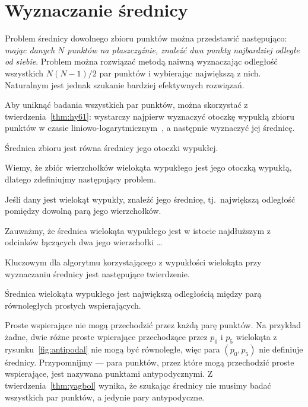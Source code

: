 \chapter{Wyznaczanie średnicy\label{chap:diameter}}
Problem średnicy dowolnego zbioru punktów można przedstawić
następująco: \emph{mając danych $N$ punktów na płaszczyźnie, znaleźć
  dwa punkty najbardziej odległe od siebie}. Problem można rozwiązać
metodą naiwną wyznaczając odległość wszystkich $N(N-1)/2$ par punktów
i wybierając największą z nich. Naturalnym jest jednak szukanie
bardziej efektywnych rozwiązań.

Aby uniknąć badania wszystkich par punktów, można skorzystać z
twierdzenia~\ref{thm:hy61}: wystarczy najpierw wyznaczyć otoczkę
wypukłą zbioru punktów w czasie
liniowo-logarytmicznym~\cite{Graham72}, a następnie wyznaczyć jej
średnicę.

\begin{twierdzenie}
  Średnica zbioru jest równa średnicy jego otoczki wypukłej.
\end{twierdzenie}

Wiemy, że zbiór wierzchołków wielokąta wypukłego jest jego otoczką
wypukłą, dlatego zdefiniujmy następujący problem.

\begin{problem}
  Jeśli dany jest wielokąt wypukły, znaleźć jego średnicę,
  tj.\ największą odległość pomiędzy dowolną parą jego wierzchołków.
\end{problem}

Zauważmy, że średnica wielokąta wypukłego jest w istocie najdłuższym z
odcinków łączących dwa jego wierzchołki \ldots

Kluczowym dla algorytmu korzystającego z wypukłości wielokąta przy
wyznaczaniu średnicy jest następujące twierdzenie.

\begin{twierdzenie}
\label{thm:yagbol}
  Średnica wielokąta wypukłego jest największą odległością między parą
  równoległych prostych wspierających.
\end{twierdzenie}

Proste wspierające nie mogą przechodzić przez każdą parę punktów. Na
przykład żadne, dwie różne proste wpierające przechodzące przez $p_0$
i $p_5$ wielokąta z rysunku~\ref{fig:antipodal} nie mogą być
równoległe, więc para $(p_{0},p_{5})$ nie definiuje
średnicy. Przypomnijmy --- para punktów, przez które mogą przechodzić
proste wspierające, jest nazywana punktami antypodycznymi. Z
twierdzenia~\ref{thm:yagbol} wynika, że szukając średnicy nie musimy
badać wszystkich par punktów, a jedynie pary antypodyczne.

